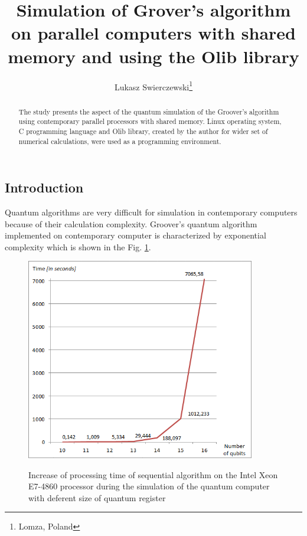 \documentclass[10pt, a5paper]{article}
\begin{document}
\title{Simulation of Grover's algorithm on parallel computers with shared memory and using the Olib library}%

\author{Lukasz Swierczewski\footnote{Lomza, Poland}}
\maketitle

\begin{abstract}
The study presents the aspect of the quantum simulation of the Groover's algorithm using contemporary parallel processors with shared memory. Linux operating system, C programming language and Olib library, created by the author for wider set of numerical calculations, were used as a programming environment.
\end{abstract}


\subsection*{Introduction}

Quantum algorithms are very difficult for simulation in contemporary computers because of their calculation complexity. Groover's quantum algorithm implemented on contemporary computer is characterized by exponential complexity which is shown in the Fig. \ref{lf1}.

\begin{figure}
  \centering
  \includegraphics[width=10cm]{18_2012_1.png}
  \label{lf1}
  \caption{Increase of processing time of sequential algorithm on the Intel Xeon E7-4860  processor during the simulation of the quantum computer with deferent size of quantum register}
\end{figure}
\end{document}
